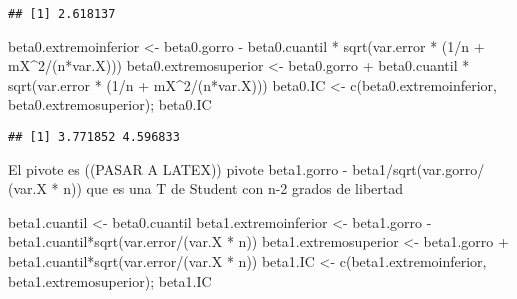 \documentclass[
]{article}
\newenvironment{Shaded}{\begin{snugshade}}{\end{snugshade}}
\newcommand{\DecValTok}[1]{\textcolor[rgb]{0.00,0.00,0.81}{#1}}
\newcommand{\FunctionTok}[1]{\textcolor[rgb]{0.00,0.00,0.00}{#1}}
\newcommand{\NormalTok}[1]{#1}
\newcommand{\OtherTok}[1]{\textcolor[rgb]{0.56,0.35,0.01}{#1}}
\newcommand{\SpecialCharTok}[1]{\textcolor[rgb]{0.00,0.00,0.00}{#1}}
\begin{document}
\begin{verbatim}
## [1] 2.618137
\end{verbatim}

\begin{Shaded}
\begin{Highlighting}[]
\NormalTok{beta0.extremoinferior }\OtherTok{\textless{}{-}}\NormalTok{ beta0.gorro }\SpecialCharTok{{-}}\NormalTok{ beta0.cuantil }\SpecialCharTok{*} \FunctionTok{sqrt}\NormalTok{(var.error }\SpecialCharTok{*}\NormalTok{ (}\DecValTok{1}\SpecialCharTok{/}\NormalTok{n }\SpecialCharTok{+}\NormalTok{ mX}\SpecialCharTok{\^{}}\DecValTok{2}\SpecialCharTok{/}\NormalTok{(n}\SpecialCharTok{*}\NormalTok{var.X)))}
\NormalTok{beta0.extremosuperior }\OtherTok{\textless{}{-}}\NormalTok{ beta0.gorro }\SpecialCharTok{+}\NormalTok{ beta0.cuantil }\SpecialCharTok{*} \FunctionTok{sqrt}\NormalTok{(var.error }\SpecialCharTok{*}\NormalTok{ (}\DecValTok{1}\SpecialCharTok{/}\NormalTok{n }\SpecialCharTok{+}\NormalTok{ mX}\SpecialCharTok{\^{}}\DecValTok{2}\SpecialCharTok{/}\NormalTok{(n}\SpecialCharTok{*}\NormalTok{var.X)))}
\NormalTok{beta0.IC }\OtherTok{\textless{}{-}} \FunctionTok{c}\NormalTok{(beta0.extremoinferior, beta0.extremosuperior); beta0.IC}
\end{Highlighting}
\end{Shaded}

\begin{verbatim}
## [1] 3.771852 4.596833
\end{verbatim}

El pivote es ((PASAR A LATEX)) pivote beta1.gorro -
beta1/sqrt(var.gorro/ (var.X * n)) que es una T de Student con n-2
grados de libertad

\begin{Shaded}
\begin{Highlighting}[]
\NormalTok{beta1.cuantil }\OtherTok{\textless{}{-}}\NormalTok{ beta0.cuantil}
\NormalTok{beta1.extremoinferior }\OtherTok{\textless{}{-}}\NormalTok{ beta1.gorro }\SpecialCharTok{{-}}\NormalTok{ beta1.cuantil}\SpecialCharTok{*}\FunctionTok{sqrt}\NormalTok{(var.error}\SpecialCharTok{/}\NormalTok{(var.X }\SpecialCharTok{*}\NormalTok{ n))}
\NormalTok{beta1.extremosuperior }\OtherTok{\textless{}{-}}\NormalTok{ beta1.gorro }\SpecialCharTok{+}\NormalTok{ beta1.cuantil}\SpecialCharTok{*}\FunctionTok{sqrt}\NormalTok{(var.error}\SpecialCharTok{/}\NormalTok{(var.X }\SpecialCharTok{*}\NormalTok{ n))}
\NormalTok{beta1.IC }\OtherTok{\textless{}{-}} \FunctionTok{c}\NormalTok{(beta1.extremoinferior, beta1.extremosuperior); beta1.IC}
\end{Highlighting}
\end{Shaded}
\end{document}
